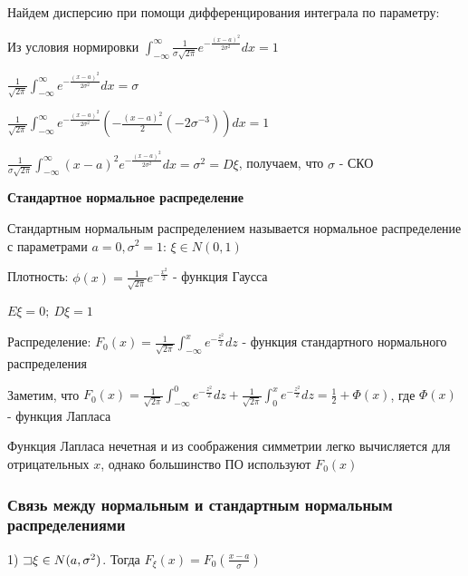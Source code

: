 \documentclass[12pt]{article}
\begin{document}
    Найдем дисперсию при помощи дифференцирования интеграла по параметру: 
    
    Из условия нормировки $\int_{-\infty}^\infty \frac{1}{\sigma \sqrt{2\pi}} e^{-\frac{(x - a)^2}{2\sigma^2}} dx = 1$

    $\frac{1}{\sqrt{2\pi}} \int_{-\infty}^\infty e^{-\frac{(x - a)^2}{2\sigma^2}} dx = \sigma$
    
    $\frac{1}{\sqrt{2\pi}} \int_{-\infty}^\infty e^{-\frac{(x - a)^2}{2\sigma^2}} \left(-\frac{(x - a)^2}{2} (-2\sigma^{-3})\right) dx = 1$
    
    $\frac{1}{\sigma\sqrt{2\pi}} \int_{-\infty}^\infty (x - a)^2 e^{-\frac{(x - a)^2}{2\sigma^2}} dx = \sigma^2 = D\xi$, получаем, что $\sigma$ - СКО

    \mediumvspace

    \hypertarget{standardnormaldistribution}{}

    \textbf{Стандартное нормальное распределение}

    \Def Стандартным нормальным распределением называется нормальное распределение с параметрами $a = 0, \sigma^2 = 1$: $\xi \in N(0, 1)$

    Плотность: $\phi(x) = \frac{1}{\sqrt{2\pi}} e^{-\frac{x^2}{2}}$ - функция Гаусса

    $E\xi = 0; \ D\xi = 1$

    Распределение: $F_0(x) = \frac{1}{\sqrt{2\pi}} \int_{-\infty}^x e^{-\frac{z^2}{2}} dz$ - функция стандартного нормального распределения

    Заметим, что $F_0(x) = \frac{1}{\sqrt{2\pi}} \int_{-\infty}^0 e^{-\frac{z^2}{2}} dz + \frac{1}{\sqrt{2\pi}} \int_0^x e^{-\frac{z^2}{2}} dz = \frac{1}{2} + \Phi(x)$, где $\Phi(x)$ - функция Лапласа

    Функция Лапласа нечетная и из соображения симметрии легко вычисляется для отрицательных $x$, однако большинство ПО используют $F_0(x)$
    
    \hypertarget{connectionbetweennormalandstandard}{}

    \subsubsection{Связь между нормальным и стандартным нормальным распределениями}

    1) $\mathord{\sqsupset} \xi \in N(a, \sigma^2)$. Тогда $F_\xi(x) = F_0\left(\frac{x - a}{\sigma}\right)$
\end{document}
